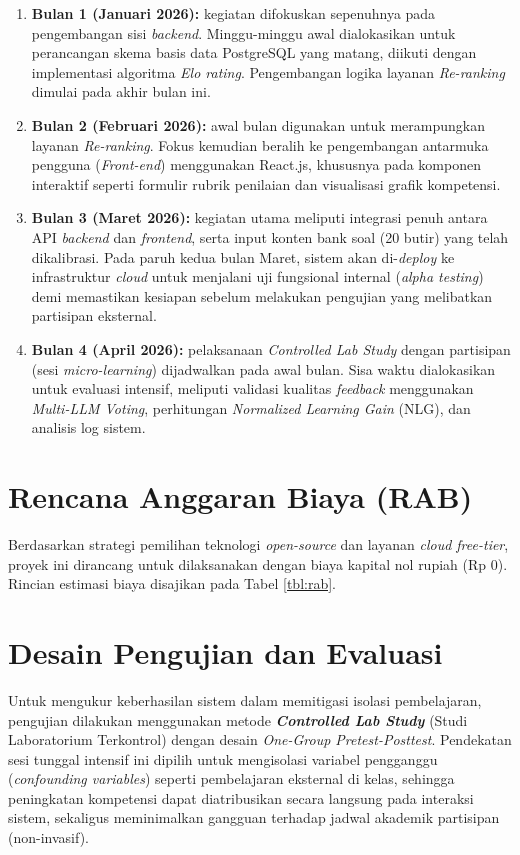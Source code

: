 \begin{enumerate}
    \item \textbf{Bulan 1 (Januari 2026):}
    kegiatan difokuskan sepenuhnya pada pengembangan sisi \textit{backend}. Minggu-minggu awal dialokasikan untuk perancangan skema basis data PostgreSQL yang matang, diikuti dengan implementasi algoritma \textit{Elo rating}. Pengembangan logika layanan \textit{Re-ranking} dimulai pada akhir bulan ini.
    
    \item \textbf{Bulan 2 (Februari 2026):}
    awal bulan digunakan untuk merampungkan layanan \textit{Re-ranking}. Fokus kemudian beralih ke pengembangan antarmuka pengguna (\textit{Front-end}) menggunakan React.js, khususnya pada komponen interaktif seperti formulir rubrik penilaian dan visualisasi grafik kompetensi.
    
    \item \textbf{Bulan 3 (Maret 2026):}
    kegiatan utama meliputi integrasi penuh antara API \textit{backend} dan \textit{frontend}, serta input konten bank soal (20 butir) yang telah dikalibrasi. Pada paruh kedua bulan Maret, sistem akan di-\textit{deploy} ke infrastruktur \textit{cloud} untuk menjalani uji fungsional internal (\textit{alpha testing}) demi memastikan kesiapan sebelum melakukan pengujian yang melibatkan partisipan eksternal.
    
    \item \textbf{Bulan 4 (April 2026):}
    pelaksanaan \textit{Controlled Lab Study} dengan partisipan (sesi \textit{micro-learning}) dijadwalkan pada awal bulan. Sisa waktu dialokasikan untuk evaluasi intensif, meliputi validasi kualitas \textit{feedback} menggunakan \textit{Multi-LLM Voting}, perhitungan \textit{Normalized Learning Gain} (NLG), dan analisis log sistem.
\end{enumerate}

\section{Rencana Anggaran Biaya (RAB)}
\label{sec:rab}
Berdasarkan strategi pemilihan teknologi \textit{open-source} dan layanan \textit{cloud free-tier}, proyek ini dirancang untuk dilaksanakan dengan biaya kapital nol rupiah (Rp 0). Rincian estimasi biaya disajikan pada Tabel \ref{tbl:rab}.



\section{Desain Pengujian dan Evaluasi}
\label{sec:desain_pengujian}
Untuk mengukur keberhasilan sistem dalam memitigasi isolasi
pembelajaran, pengujian dilakukan menggunakan metode
\textbf{\textit{Controlled Lab Study}} (Studi Laboratorium
Terkontrol) dengan desain \textit{One-Group Pretest-Posttest}.
Pendekatan sesi tunggal intensif ini dipilih untuk mengisolasi
variabel pengganggu (\textit{confounding variables}) seperti
pembelajaran eksternal di kelas, sehingga peningkatan kompetensi
dapat diatribusikan secara langsung pada interaksi sistem,
sekaligus meminimalkan gangguan terhadap jadwal akademik
partisipan (non-invasif).

